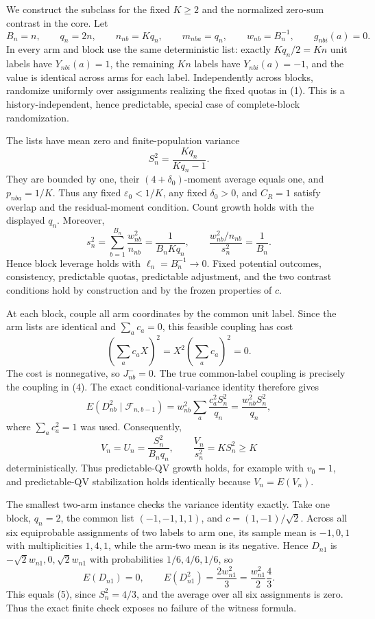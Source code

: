 We construct the subclass for the fixed \(K\ge2\) and the normalized
zero-sum contrast in the core.  Let
\[
B_n=n,\qquad q_n=2n,\qquad n_{nb}=Kq_n,\qquad
m_{nba}=q_n,\qquad w_{nb}=B_n^{-1},\qquad g_{nbi}(a)=0.
\tag{1}
\]
In every arm and block use the same deterministic list: exactly
\(Kq_n/2=Kn\) unit labels have \(Y_{nbi}(a)=1\), the remaining \(Kn\)
labels have \(Y_{nbi}(a)=-1\), and the value is identical across arms for
each label.  Independently across blocks, randomize uniformly over
assignments realizing the fixed quotas in (1).  This is a history-independent,
hence predictable, special case of complete-block randomization.

The lists have mean zero and finite-population variance
\[
S_n^2=\frac{Kq_n}{Kq_n-1}.
\tag{2}
\]
They are bounded by one, their \((4+\delta_0)\)-moment average equals one,
and \(p_{nba}=1/K\).  Thus any fixed \(\varepsilon_0<1/K\), any fixed
\(\delta_0>0\), and \(C_R=1\) satisfy overlap and the residual-moment
condition.  Count growth holds with the displayed \(q_n\).  Moreover,
\[
s_n^2=\sum_{b=1}^{B_n}\frac{w_{nb}^2}{n_{nb}}
=\frac1{B_nKq_n},
\qquad
\frac{w_{nb}^2/n_{nb}}{s_n^2}=\frac1{B_n}.
\tag{3}
\]
Hence block leverage holds with \(\ell_n=B_n^{-1}\to0\).  Fixed potential
outcomes, consistency, predictable quotas, predictable adjustment, and the
two contrast conditions hold by construction and by the frozen properties
of \(c\).

At each block, couple all arm coordinates by the common unit label.  Since
the arm lists are identical and \(\sum_ac_a=0\), this feasible coupling has
cost
\[
\left(\sum_ac_aX\right)^2=X^2\left(\sum_ac_a\right)^2=0.
\tag{4}
\]
The cost is nonnegative, so \(J_{nb}^{-}=0\).  The true common-label
coupling is precisely the coupling in (4).  The exact conditional-variance
identity therefore gives
\[
E(D_{nb}^2\mid\mathcal F_{n,b-1})
=w_{nb}^2\sum_a\frac{c_a^2S_n^2}{q_n}
=\frac{w_{nb}^2S_n^2}{q_n},
\tag{5}
\]
where \(\sum_ac_a^2=1\) was used.  Consequently,
\[
V_n=U_n=\frac{S_n^2}{B_nq_n},
\qquad
\frac{V_n}{s_n^2}=KS_n^2\ge K
\tag{6}
\]
deterministically.  Thus predictable-QV growth holds, for example with
\(v_0=1\), and predictable-QV stabilization holds identically because
\(V_n=E(V_n)\).

The smallest two-arm instance checks the variance identity exactly.  Take
one block, \(q_n=2\), the common list \((-1,-1,1,1)\), and
\(c=(1,-1)/\sqrt2\).  Across all six equiprobable assignments of two labels
to arm one, its sample mean is \(-1,0,1\) with multiplicities \(1,4,1\),
while the arm-two mean is its negative.  Hence \(D_{n1}\) is
\(-\sqrt2w_{n1},0,\sqrt2w_{n1}\) with probabilities
\(1/6,4/6,1/6\), so
\[
E(D_{n1})=0,
\qquad E(D_{n1}^2)=\frac{2w_{n1}^2}{3}
=\frac{w_{n1}^2}{2}\frac{4}{3}.
\tag{7}
\]
This equals (5), since \(S_n^2=4/3\), and the average over all six
assignments is zero.  Thus the exact finite check
exposes no failure of the witness formula.

